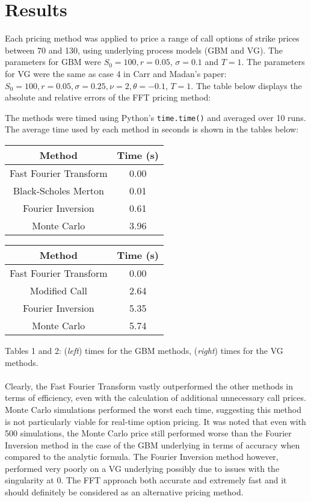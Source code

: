 \documentclass[11pt]{article}
\begin{document}
	\section{Results}
	Each pricing method was applied to price a range of call options of strike prices between 70 and 130, using underlying process models (GBM and VG). The parameters for GBM were \( S_0 = 100, r = 0.05 \), \( \sigma = 0.1 \) and \( T = 1 \). The parameters for VG were the same as case 4 in Carr and Madan's paper: \( S_0 = 100, r = 0.05, \sigma = 0.25, \nu = 2, \theta = -0.1 \), \( T = 1 \). The table below displays the absolute and relative errors of the FFT pricing method:
	
	 
	
	\noindent The methods were timed using Python's \colorbox{gray!25}{\texttt{time.time()}} and averaged over 10 runs. The average time used by each method in seconds is shown in the tables below:
	\begin{center}
		\begin{tabular}{cc}
			\hline
			\hline
			\textbf{Method} & \textbf{Time (s)}\\
			\hline
			Fast Fourier Transform & 0.00\\
			Black-Scholes Merton & 0.01 \\
			Fourier Inversion & 0.61 \\
			Monte Carlo & 3.96 \\
			\hline
			\end{tabular}\hspace{1cm}
		\begin{tabular}{cc}
			\hline
			\hline
			\textbf{Method} & \textbf{Time (s)}\\
			\hline
			Fast Fourier Transform & 0.00\\
			Modified Call & 2.64 \\
			Fourier Inversion & 5.35 \\
			Monte Carlo & 5.74 \\
			\hline
		\end{tabular}
	\end{center}
	Tables 1 and 2: (\textit{left}) times for the GBM methods, (\textit{right}) times for the VG methods.\\\\
	Clearly, the Fast Fourier Transform vastly outperformed the other methods in terms of efficiency, even with the calculation of additional unnecessary call prices. Monte Carlo simulations performed the worst each time, suggesting this method is not particularly viable for real-time option pricing. It was noted that even with 500 simulations, the Monte Carlo price still performed worse than the Fourier Inversion method in the case of the GBM underlying in terms of accuracy when compared to the analytic formula. The Fourier Inversion method however, performed very poorly on a VG underlying possibly due to issues with the singularity at 0. The FFT approach both accurate and extremely fast and it should definitely be considered as an alternative pricing method. 
		
\end{document}
